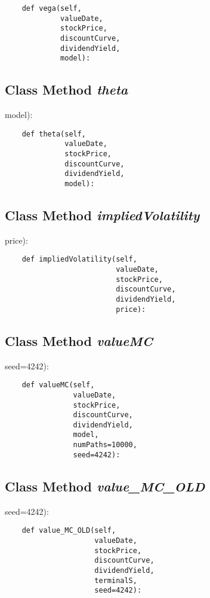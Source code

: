 \documentclass[twoside,11pt]{book}
\begin{document}
\begin{lstlisting}
    def vega(self,
             valueDate,
             stockPrice,
             discountCurve,
             dividendYield,
             model):
\end{lstlisting}

\subsection{Class Method {\it theta}}
model):

\begin{lstlisting}
    def theta(self,
              valueDate,
              stockPrice,
              discountCurve,
              dividendYield,
              model):
\end{lstlisting}

\subsection{Class Method {\it impliedVolatility}}
price):

\begin{lstlisting}
    def impliedVolatility(self,
                          valueDate,
                          stockPrice,
                          discountCurve,
                          dividendYield,
                          price):
\end{lstlisting}

\subsection{Class Method {\it valueMC}}
seed=4242):

\begin{lstlisting}
    def valueMC(self,
                valueDate,
                stockPrice,
                discountCurve,
                dividendYield,
                model,
                numPaths=10000,
                seed=4242):
\end{lstlisting}

\subsection{Class Method {\it value\_MC\_OLD}}
seed=4242):

\begin{lstlisting}
    def value_MC_OLD(self,
                     valueDate,
                     stockPrice,
                     discountCurve,
                     dividendYield,
                     terminalS,
                     seed=4242):
\end{lstlisting}
\end{document}
